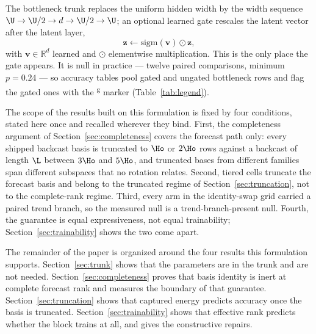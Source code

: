 The bottleneck trunk replaces the uniform hidden width by the width sequence $\U \to \U/2 \to d
\to \U/2 \to \U$; an optional learned gate rescales the latent vector after the latent layer,
\begin{equation}
\mathbf{z} \leftarrow \mathrm{sigm}(\mathbf{v}) \odot \mathbf{z},
\label{eq:gate}
\end{equation}
with $\mathbf{v} \in \mathbb{R}^{d}$ learned and $\odot$ elementwise multiplication. This is the
only place the gate appears. It is null in practice --- twelve paired comparisons, minimum
$p = 0.24$ --- so accuracy tables pool gated and ungated bottleneck rows and flag the gated ones
with the \textsuperscript{g} marker (Table~\ref{tab:legend}).

The scope of the results built on this formulation is fixed by four conditions, stated here once
and recalled wherever they bind. First, the completeness argument of
Section~\ref{sec:completeness} covers the forecast path only: every shipped backcast basis is
truncated to $\Ho$ or $2\Ho$ rows against a backcast of length $\L$ between $3\Ho$ and $5\Ho$,
and truncated bases from different families span different subspaces that no rotation relates.
Second, tiered cells truncate the forecast basis and belong to the truncated regime of
Section~\ref{sec:truncation}, not to the complete-rank regime. Third, every arm in the
identity-swap grid carried a paired trend branch, so the measured null is a
trend-branch-present null. Fourth, the guarantee is equal expressiveness, not equal
trainability; Section~\ref{sec:trainability} shows the two come apart.

The remainder of the paper is organized around the four results this formulation supports.
Section~\ref{sec:trunk} shows that the parameters are in the trunk and are not needed.
Section~\ref{sec:completeness} proves that basis identity is inert at complete forecast rank and
measures the boundary of that guarantee. Section~\ref{sec:truncation} shows that captured
energy predicts accuracy once the basis is truncated. Section~\ref{sec:trainability} shows that
effective rank predicts whether the block trains at all, and gives the constructive repairs.

